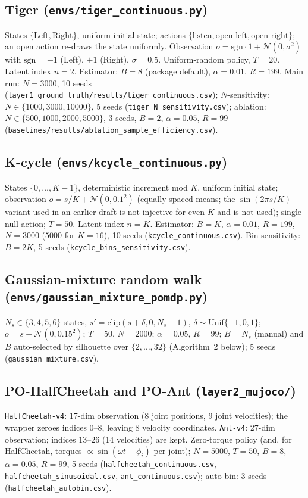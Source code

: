 \documentclass[10pt]{article}
\begin{document}
\subsection{Tiger (\texttt{envs/tiger\_continuous.py})}
States $\{\text{Left},\text{Right}\}$, uniform initial state; actions
$\{\text{listen},\text{open-left},\text{open-right}\}$; an open action re-draws
the state uniformly.  Observation $o=\mathrm{sgn}\cdot1+\mathcal N(0,\sigma^2)$
with $\mathrm{sgn}=-1$ (Left), $+1$ (Right), $\sigma=0.5$.  Uniform-random
policy, $T=20$.  Latent index $n=2$.  Estimator: $B=8$ (package default),
$\alpha=0.01$, $R=199$.  Main run: $N=3000$, 10 seeds
(\texttt{layer1\_ground\_truth/results/tiger\_continuous.csv}); $N$-sensitivity:
$N\in\{1000,3000,10000\}$, 5 seeds (\texttt{tiger\_N\_sensitivity.csv});
ablation: $N\in\{500,1000,2000,5000\}$, 3 seeds, $B=2$, $\alpha=0.05$, $R=99$
(\texttt{baselines/results/ablation\_sample\_efficiency.csv}).

\subsection{K-cycle (\texttt{envs/kcycle\_continuous.py})}
States $\{0,\dots,K-1\}$, deterministic increment mod $K$, uniform initial
state; observation $o=s/K+\mathcal N(0,0.1^2)$ (equally spaced means; the
$\sin(2\pi s/K)$ variant used in an earlier draft is not injective for even
$K$ and is not used); single null action; $T=50$.  Latent index $n=K$.
Estimator: $B=K$, $\alpha=0.01$, $R=199$, $N=3000$ ($5000$ for $K=16$),
10 seeds (\texttt{kcycle\_continuous.csv}).  Bin sensitivity: $B=2K$, 5 seeds
(\texttt{kcycle\_bins\_sensitivity.csv}).

\subsection{Gaussian-mixture random walk (\texttt{envs/gaussian\_mixture\_pomdp.py})}
$N_s\in\{3,4,5,6\}$ states, $s'=\mathrm{clip}(s+\delta,0,N_s-1)$,
$\delta\sim\mathrm{Unif}\{-1,0,1\}$; $o=s+\mathcal N(0,0.15^2)$; $T=50$,
$N=2000$; $\alpha=0.05$, $R=99$; $B=N_s$ (manual) and $B$ auto-selected by
silhouette over $\{2,\dots,32\}$ (Algorithm~2 below); 5 seeds
(\texttt{gaussian\_mixture.csv}).

\subsection{PO-HalfCheetah and PO-Ant (\texttt{layer2\_mujoco/})}
\texttt{HalfCheetah-v4}: 17-dim observation (8 joint positions, 9 joint
velocities); the wrapper zeroes indices $0$--$8$, leaving 8 velocity
coordinates.  \texttt{Ant-v4}: 27-dim observation; indices $13$--$26$ (14
velocities) are kept.  Zero-torque policy (and, for HalfCheetah, torques
$\propto\sin(\omega t+\phi_i)$ per joint); $N=5000$, $T=50$, $B=8$,
$\alpha=0.05$, $R=99$, 5 seeds (\texttt{halfcheetah\_continuous.csv},
\texttt{halfcheetah\_sinusoidal.csv}, \texttt{ant\_continuous.csv});
auto-bin: 3 seeds (\texttt{halfcheetah\_autobin.csv}).
\end{document}

